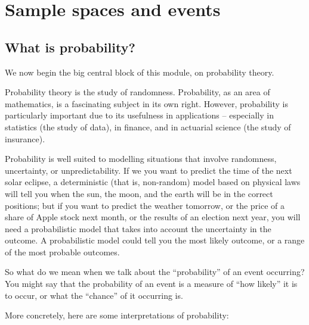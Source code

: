 \documentclass[
  a4paper,
]{book}
\theoremstyle{definition}
\theoremstyle{definition}
\theoremstyle{definition}
\theoremstyle{definition}
\theoremstyle{remark}
\begin{document}
\hypertarget{L03-events}{%
\chapter{Sample spaces and events}\label{L03-events}}

\renewcommand{\complement}{\mathsf{c}}
\newcommand{\comp}{\complement}
\newcommand{\ff}[2]{{#1}^{\underline{#2}}}

\hypertarget{what-is-prob}{%
\section{What is probability?}\label{what-is-prob}}

We now begin the big central block of this module, on probability theory.

Probability theory is the study of randomness. Probability, as an area of mathematics, is a fascinating subject in its own right. However, probability is particularly important due to its usefulness in applications -- especially in statistics (the study of data), in finance, and in actuarial science (the study of insurance).

Probability is well suited to modelling situations that involve randomness, uncertainty, or unpredictability. If we you want to predict the time of the next solar eclipse, a deterministic (that is, non-random) model based on physical laws will tell you when the sun, the moon, and the earth will be in the correct positions; but if you want to predict the weather tomorrow, or the price of a share of Apple stock next month, or the results of an election next year, you will need a probabilistic model that takes into account the uncertainty in the outcome. A probabilistic model could tell you the most likely outcome, or a range of the most probable outcomes.

So what do we mean when we talk about the ``probability'' of an event occurring? You might say that the probability of an event is a measure of ``how likely'' it is to occur, or what the ``chance'' of it occurring is.

More concretely, here are some interpretations of probability:
\end{document}
